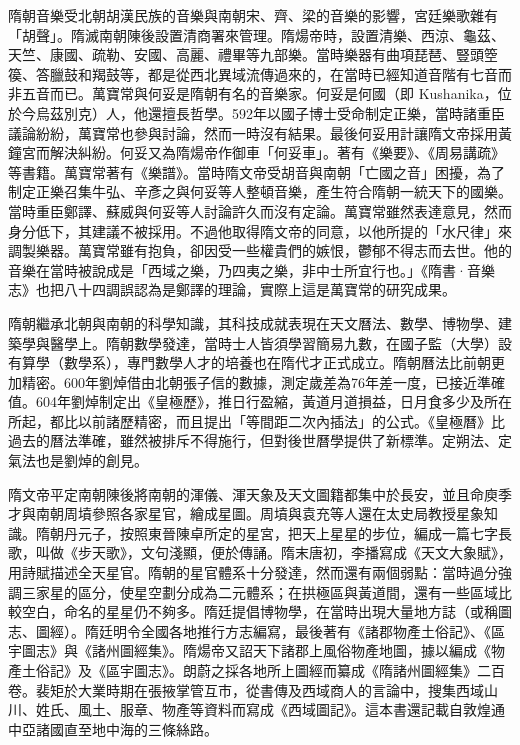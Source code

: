 隋朝音樂受北朝胡漢民族的音樂與南朝宋、齊、梁的音樂的影響，宮廷樂歌雜有「胡聲」。隋滅南朝陳後設置清商署來管理。隋煬帝時，設置清樂、西涼、龜茲、天竺、康國、疏勒、安國、高麗、禮畢等九部樂。當時樂器有曲項琵琶、豎頭箜篌、答臘鼓和羯鼓等，都是從西北異域流傳過來的，在當時已經知道音階有七音而非五音而已。萬寶常與何妥是隋朝有名的音樂家。何妥是何國（即 Kushanika，位於今烏茲別克）人，他還擅長哲學。592年以國子博士受命制定正樂，當時諸重臣議論紛紛，萬寶常也參與討論，然而一時沒有結果。最後何妥用計讓隋文帝採用黃鐘宮而解決糾紛。何妥又為隋煬帝作御車「何妥車」。著有《樂要》、《周易講疏》等書籍。萬寶常著有《樂譜》。當時隋文帝受胡音與南朝「亡國之音」困擾，為了制定正樂召集牛弘、辛彥之與何妥等人整頓音樂，產生符合隋朝一統天下的國樂。當時重臣鄭譯、蘇威與何妥等人討論許久而沒有定論。萬寶常雖然表達意見，然而身分低下，其建議不被採用。不過他取得隋文帝的同意，以他所提的「水尺律」來調製樂器。萬寶常雖有抱負，卻因受一些權貴們的嫉恨，鬱郁不得志而去世。他的音樂在當時被說成是「西域之樂，乃四夷之樂，非中士所宜行也。」《隋書·音樂志》也把八十四調誤認為是鄭譯的理論，實際上這是萬寶常的研究成果。

隋朝繼承北朝與南朝的科學知識，其科技成就表現在天文曆法、數學、博物學、建築學與醫學上。隋朝數學發達，當時士人皆須學習簡易九數，在國子監（大學）設有算學（數學系），專門數學人才的培養也在隋代才正式成立。隋朝曆法比前朝更加精密。600年劉焯借由北朝張子信的數據，測定歲差為76年差一度，已接近準確值。604年劉焯制定出《皇極歷》，推日行盈縮，黃道月道損益，日月食多少及所在所起，都比以前諸歷精密，而且提出「等間距二次內插法」的公式。《皇極曆》比過去的曆法準確，雖然被排斥不得施行，但對後世曆學提供了新標準。定朔法、定氣法也是劉焯的創見。

隋文帝平定南朝陳後將南朝的渾儀、渾天象及天文圖籍都集中於長安，並且命庾季才與南朝周墳參照各家星官，繪成星圖。周墳與袁充等人還在太史局教授星象知識。隋朝丹元子，按照東晉陳卓所定的星宮，把天上星星的步位，編成一篇七字長歌，叫做《步天歌》，文句淺顯，便於傳誦。隋末唐初，李播寫成《天文大象賦》，用詩賦描述全天星官。隋朝的星官體系十分發達，然而還有兩個弱點：當時過分強調三家星的區分，使星空劃分成為二元體系；在拱極區與黃道間，還有一些區域比較空白，命名的星星仍不夠多。隋廷提倡博物學，在當時出現大量地方誌（或稱圖志、圖經）。隋廷明令全國各地推行方志編寫，最後著有《諸郡物產土俗記》、《區宇圖志》與《諸州圖經集》。隋煬帝又詔天下諸郡上風俗物產地圖，據以編成《物產土俗記》及《區宇圖志》。朗蔚之採各地所上圖經而纂成《隋諸州圖經集》二百卷。裴矩於大業時期在張掖掌管互市，從書傳及西域商人的言論中，搜集西域山川、姓氏、風土、服章、物產等資料而寫成《西域圖記》。這本書還記載自敦煌通中亞諸國直至地中海的三條絲路。

